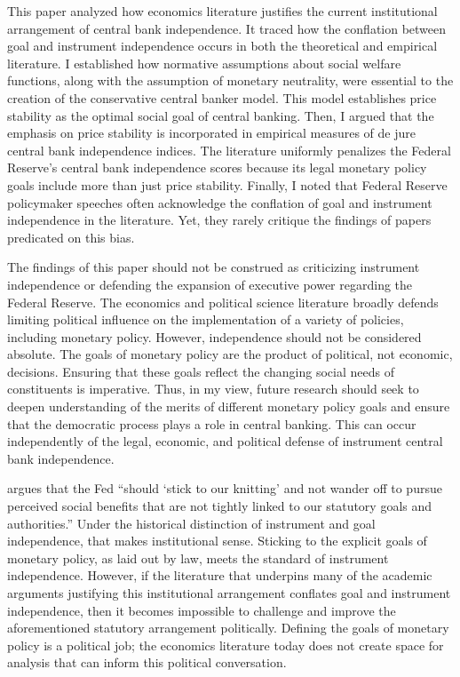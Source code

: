 \documentclass[12pt,a4paper]{article}
\begin{document}
\begin{doublespace}
This paper analyzed how economics literature justifies the current institutional arrangement of central bank independence. It traced how the conflation between goal and instrument independence occurs in both the theoretical and empirical literature. I established how normative assumptions about social welfare functions, along with the assumption of monetary neutrality, were essential to the creation of the conservative central banker model. This model establishes price stability as the optimal social goal of central banking. Then, I argued that the emphasis on price stability is incorporated in empirical measures of de jure central bank independence indices. The literature uniformly penalizes the Federal Reserve's central bank independence scores because its legal monetary policy goals include more than just price stability. Finally, I noted that Federal Reserve policymaker speeches often acknowledge the conflation of goal and instrument independence in the literature. Yet, they rarely critique the findings of papers predicated on this bias.

The findings of this paper should not be construed as criticizing instrument independence or defending the expansion of executive power regarding the Federal Reserve. The economics and political science literature broadly defends limiting political influence on the implementation of a variety of policies, including monetary policy. However, independence should not be considered absolute. The goals of monetary policy are the product of political, not economic, decisions. Ensuring that these goals reflect the changing social needs of constituents is imperative. Thus, in my view, future research should seek to deepen understanding of the merits of different monetary policy goals and ensure that the democratic process plays a role in central banking. This can occur independently of the legal, economic, and political defense of instrument central bank independence.

\textcite{powell_panel_2023} argues that the Fed ``should `stick to our knitting' and not wander off to pursue perceived social benefits that are not tightly linked to our statutory goals and authorities.'' Under the historical distinction of instrument and goal independence, that makes institutional sense. Sticking to the explicit goals of monetary policy, as laid out by law, meets the standard of instrument independence. However, if the literature that underpins many of the academic arguments justifying this institutional arrangement conflates goal and instrument independence, then it becomes impossible to challenge and improve the aforementioned statutory arrangement politically. Defining the goals of monetary policy is a political job; the economics literature today does not create space for analysis that can inform this political conversation.


\end{doublespace}
\end{document}

